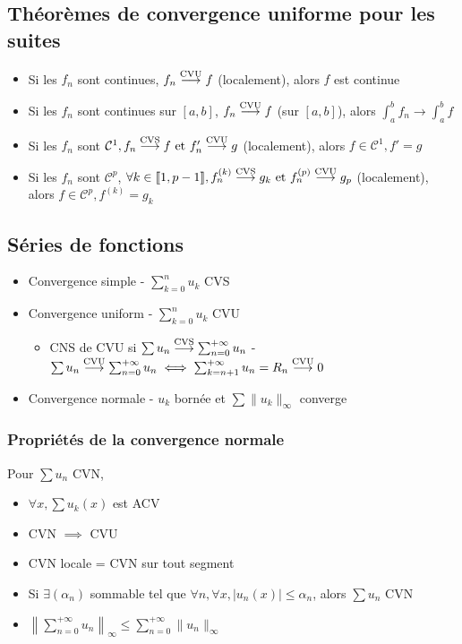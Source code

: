 \documentclass[openany]{book}
\begin{document}
\subsection{Théorèmes de convergence uniforme pour les suites}

\begin{itemize}
    \item Si les $f_n$ sont continues, $f_n \overset{\text{CVU}}{\longrightarrow} f$ (localement), alors $f$ est continue
    \item Si les $f_n$ sont continues sur $[a, b]$, $f_n \overset{\text{CVU}}{\longrightarrow} f$ (sur $[a, b]$), alors $\int_{a}^{b} f_n \longrightarrow \int_{a}^{b} f$
    \item Si les $f_n$ sont $\mathcal{C}^1, f_n \overset{\text{CVS}}{\longrightarrow} f \text{ et } f_n' \overset{\text{CVU}}{\longrightarrow} g$ (localement), alors $f \in \mathcal{C}^1, f' = g$ 
    \item Si les $f_n$ sont $\mathcal{C}^p$, $\forall k \in \llbracket {1}, {p-1} \rrbracket, f_n^{(k)} \overset{\text{CVS}}{\longrightarrow} g_k \text{ et } f_n^{(p)} \overset{\text{CVU}}{\longrightarrow} g_p$ (localement), alors $f \in \mathcal{C}^p, f^{(k)} = g_k$
\end{itemize}

\subsection{Séries de fonctions}

\begin{itemize}
    \item Convergence simple - $\sum_{k=0}^n u_k$ CVS
    \item Convergence uniform - $\sum_{k=0}^n u_k$ CVU
    \begin{itemize}
        \item CNS de CVU si $\sum u_n \overset{\text{CVS}}{\longrightarrow} \sum_{n=0}^{+\infty} u_n$ - $\sum u_n \overset{\text{CVU}}{\longrightarrow} \sum_{n=0}^{+\infty} u_n \iff \sum_{k=n+1}^{+\infty} u_n = R_n \overset{\text{CVU}}{\longrightarrow} 0$
    \end{itemize}
    \item Convergence normale - $u_k$ bornée et $\sum \|u_k\|_{\infty}$ converge
\end{itemize}

\subsubsection{Propriétés de la convergence normale}
Pour $\sum u_n$ CVN,
\begin{itemize}
    \item $\forall x, \sum u_k(x)$ est ACV
    \item CVN $\implies$ CVU
    \item CVN locale = CVN sur tout segment
    \item Si $\exists (\alpha_n)$ sommable tel que $\forall n, \forall x, |u_n(x)| \leq \alpha_n$, alors $\sum u_n$ CVN
    \item $\left\| \sum_{n=0}^{+\infty} u_n \right\|_{\infty}\leq\sum_{n=0}^{+\infty} \|u_n\|_{\infty}$
\end{itemize}
\end{document}
